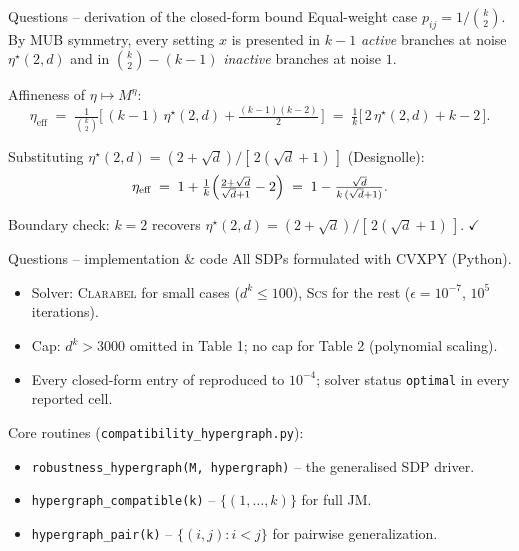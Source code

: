 \documentclass[10pt,aspectratio=169]{beamer}
\begin{document}
\begin{frame}{Questions -- derivation of the closed-form bound}
  Equal-weight case $p_{ij} = 1 / \binom{k}{2}$. By MUB symmetry, every setting $x$ is presented in $k-1$ \emph{active} branches at noise $\eta^{\star}(2, d)$ and in $\binom{k}{2} - (k-1)$ \emph{inactive} branches at noise $1$.

  \medskip
  Affineness of $\eta \mapsto M^{\eta}$:
  \[
    \eta_{\text{eff}}
    \;=\; \tfrac{1}{\binom{k}{2}}
          \bigl[\,(k-1)\,\eta^{\star}(2, d)
                 + \tfrac{(k-1)(k-2)}{2}\,\bigr]
    \;=\; \tfrac{1}{k}\bigl[\,2\,\eta^{\star}(2, d) + k - 2\,\bigr].
  \]

  \medskip
  Substituting $\eta^{\star}(2, d) = (2 + \sqrt d)/[\,2(\sqrt d + 1)\,]$ (Designolle):
  \[
    \eta_{\text{eff}}
    \;=\; 1 + \tfrac{1}{k}\Bigl(\tfrac{2 + \sqrt d}{\sqrt d + 1} - 2\Bigr)
    \;=\; 1 - \tfrac{\sqrt d}{k\,(\sqrt d + 1)}.
  \]

  \medskip
  Boundary check: $k = 2$ recovers $\eta^{\star}(2, d) = (2 + \sqrt d)/[\,2(\sqrt d + 1)\,].\;\checkmark$
\end{frame}

\begin{frame}{Questions -- implementation \& code}
  All SDPs formulated with \alert{CVXPY} (Python).
  \begin{itemize}
    \item Solver: \textsc{Clarabel} for small cases ($d^k \le 100$), \textsc{Scs} for the rest ($\epsilon = 10^{-7}$, $10^{5}$ iterations).
    \item Cap: $d^k > 3000$ omitted in Table 1; no cap for Table 2 (polynomial scaling).
    \item Every closed-form entry of \cite{Designolle2019} reproduced to $10^{-4}$; solver status \texttt{optimal} in every reported cell.
  \end{itemize}

  \medskip
  Core routines (\texttt{compatibility\_hypergraph.py}):
  \begin{itemize}
    \item \texttt{robustness\_hypergraph(M, hypergraph)} -- the generalised SDP driver.
    \item \texttt{hypergraph\_compatible(k)} -- $\{(1, \dots, k)\}$ for full JM.
    \item \texttt{hypergraph\_pair(k)} -- $\{(i, j) : i < j\}$ for pairwise generalization.
  \end{itemize}
\end{frame}
\end{document}
